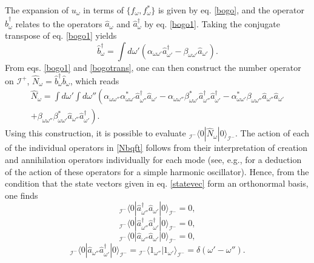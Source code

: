 \documentclass[
12pt,		%
openright,	%
twoside,  %
a4paper,			%
chapter=TITLE,		%
english,			%
french,				%
spanish,			%
brazil				%
]{USPSC-classe/USPSC}
\begin{document}
The expansion of $u_{\omega}$ in terms of $\{f_{\omega},f_{\omega}^*\}$ is given by eq. \ref{bogo}, and the operator $\hat{b}_{\omega}^{\dag}$ relates to the operators $\hat{a}_{\omega}$ and $\hat{a}_{\omega}^{\dag}$ by eq. \ref{bogo1}. Taking the conjugate transpose of eq. \ref{bogo1} yields
\begin{equation}\label{bogotrans}
    \hat{b}_{\omega}^{\dag}=\int d\omega'(\alpha_{\omega\omega'}\hat{a}^{\dag}_{\omega'}-\beta_{\omega\omega'}\hat{a}_{\omega'}).
\end{equation}
From eqs. \ref{bogo1} and \ref{bogotrans}, one can then construct the number operator on $\mathscr{I}^+$, $\hat{N}_{\omega}=\hat{b}_{\omega}^{\dag}\hat{b}_{\omega}$, which reads
\begin{multline}\label{Nbqft}
    \hat{N}_{\omega}=\int d\omega'\int d\omega''\left(\alpha_{\omega\omega''}\alpha^*_{\omega\omega'}\hat{a}_{\omega''}^{\dag}\hat{a}_{\omega'}-\alpha_{\omega\omega''}\beta^*_{\omega\omega'}\hat{a}_{\omega''}^{\dag}\hat{a}_{\omega'}^{\dag}-\alpha^*_{\omega\omega'}\beta_{\omega\omega''}\hat{a}_{\omega''}\hat{a}_{\omega'}\right.\\ \left. +\beta_{\omega\omega''}\beta^*_{\omega\omega'}\hat{a}_{\omega''}\hat{a}_{\omega'}^{\dag}\right) .
\end{multline}
Using this construction, it is possible to evaluate $_{{\mathscr{I}^-}}\langle0|\hat{N}_{\omega}|0\rangle_{\mathscr{I}^-}$. The action of each of the individual operators in \ref{Nbqft} follows from their interpretation of creation and annihilation operators individually for each mode (see, e.g., \cite{Sakurai1994} for a deduction of the action of these operators for a simple harmonic oscillator). Hence, from the condition that the state vectors given in eq. \ref{statevec} form an orthonormal basis, one finds
\begin{equation}
    _{{\mathscr{I}^-}}\langle0|\hat{a}_{\omega''}^{\dag}\hat{a}_{\omega'}|0\rangle_{\mathscr{I}^-}=0,
\end{equation}
\begin{equation}
    _{{\mathscr{I}^-}}\langle0|\hat{a}_{\omega''}^{\dag}\hat{a}_{\omega'}^{\dag}|0\rangle_{\mathscr{I}^-}=0,
\end{equation}
\begin{equation}
    _{{\mathscr{I}^-}}\langle0|\hat{a}_{\omega''}\hat{a}_{\omega'}|0\rangle_{\mathscr{I}^-}=0,
\end{equation}
\begin{equation}
    _{{\mathscr{I}^-}}\langle0|\hat{a}_{\omega''}\hat{a}_{\omega'}^{\dag}|0\rangle_{\mathscr{I}^-}={}_{{\mathscr{I}^-}}\langle 1_{\omega''}|1_{\omega'}\rangle_{\mathscr{I}^-}=\delta(\omega'-\omega'').
\end{equation}
\end{document}
